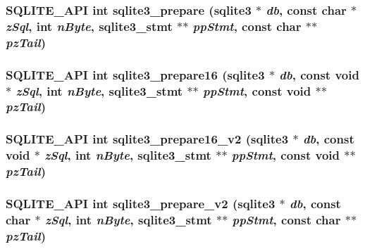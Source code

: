 \subsubsection{\setlength{\rightskip}{0pt plus 5cm}SQLITE\_\-API int sqlite3\_\-prepare (\bf{sqlite3} $\ast$ {\em db}, const char $\ast$ {\em z\-Sql}, int {\em n\-Byte}, \bf{sqlite3\_\-stmt} $\ast$$\ast$ {\em pp\-Stmt}, const char $\ast$$\ast$ {\em pz\-Tail})}\label{sqlite3_8h_ea8957d895d7b5b82a814ab0cdb92288}


\subsubsection{\setlength{\rightskip}{0pt plus 5cm}SQLITE\_\-API int sqlite3\_\-prepare16 (\bf{sqlite3} $\ast$ {\em db}, const void $\ast$ {\em z\-Sql}, int {\em n\-Byte}, \bf{sqlite3\_\-stmt} $\ast$$\ast$ {\em pp\-Stmt}, const void $\ast$$\ast$ {\em pz\-Tail})}\label{sqlite3_8h_c100b945af46a0ccf763fa39cac9feda}


\subsubsection{\setlength{\rightskip}{0pt plus 5cm}SQLITE\_\-API int sqlite3\_\-prepare16\_\-v2 (\bf{sqlite3} $\ast$ {\em db}, const void $\ast$ {\em z\-Sql}, int {\em n\-Byte}, \bf{sqlite3\_\-stmt} $\ast$$\ast$ {\em pp\-Stmt}, const void $\ast$$\ast$ {\em pz\-Tail})}\label{sqlite3_8h_d007ebc349b63a751155cf507a72e412}


\subsubsection{\setlength{\rightskip}{0pt plus 5cm}SQLITE\_\-API int sqlite3\_\-prepare\_\-v2 (\bf{sqlite3} $\ast$ {\em db}, const char $\ast$ {\em z\-Sql}, int {\em n\-Byte}, \bf{sqlite3\_\-stmt} $\ast$$\ast$ {\em pp\-Stmt}, const char $\ast$$\ast$ {\em pz\-Tail})}\label{sqlite3_8h_e5c653b392f2b8206f6a8fe71e5dc2e9}


